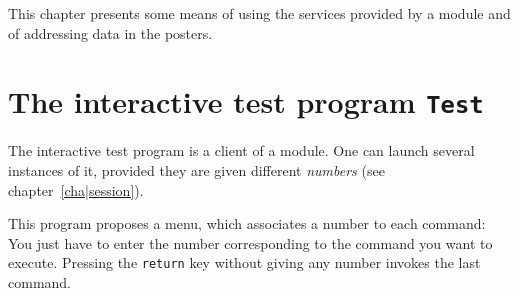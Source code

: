 %
%
%
%
%
%
%

This  chapter  presents some means of  using  the services  provided by a
module and of addressing data in the posters.


\section{The interactive test program {\tt Test}}
\label{sec|essay}

The interactive  test program  is a client  of  a module. One can  launch
several instances of it, provided they are  given different {\em numbers}
(see chapter~\ref{cha|session}).

This program proposes a menu, which associates  a number to each command:
You just have to  enter the number corresponding  to the command you want
to execute. Pressing the  {\tt  return}  key  without giving any   number
invokes the last command.

